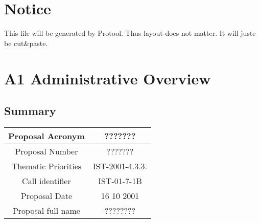 \documentclass[a4paper,11pt]{report}
\begin{document}
\section*{Notice}
This file will be generated by Protool. Thus layout does not matter. It will
juste be cut\&paste.
\section*{A1 Administrative Overview}
\subsection*{Summary}
\begin{tabular}{|c|c|}
\hline
Proposal Acronym &  ??????? \\ \hline
Proposal Number &  ??????? \\ \hline
Thematic Priorities & IST-2001-4.3.3. \\ \hline
Call identifier & IST-01-7-1B\\ \hline
Proposal Date & 16 10 2001 \\ \hline
Proposal full name & ???????? \\ \hline
\end{tabular}
\end{document}
